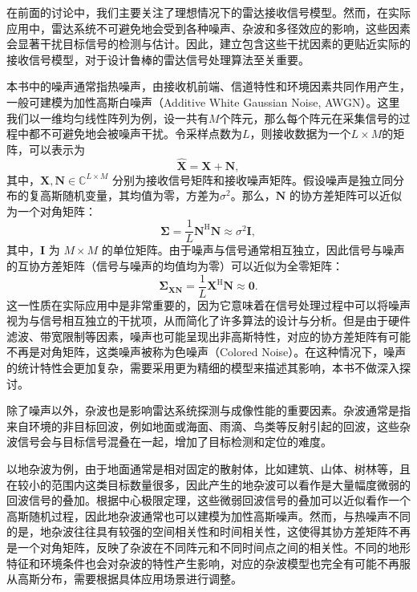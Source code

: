 在前面的讨论中，我们主要关注了理想情况下的雷达接收信号模型。然而，在实际应用中，雷达系统不可避免地会受到各种噪声、杂波和多径效应的影响，这些因素会显著干扰目标信号的检测与估计。因此，建立包含这些干扰因素的更贴近实际的接收信号模型，对于设计鲁棒的雷达信号处理算法至关重要。

本书中的噪声通常指热噪声，由接收机前端、信道特性和环境因素共同作用产生，一般可建模为加性高斯白噪声（Additive White Gaussian Noise, AWGN）。这里我们以一维均匀线性阵列为例，设一共有\( M \)个阵元，那么每个阵元在采集信号的过程中都不可避免地会被噪声干扰。令采样点数为\( L \)，则接收数据为一个\( L \times M \)的矩阵，可以表示为
\[
    \hat{\mathbf{X}} = \mathbf{X} + \mathbf{N},
\]
其中，\(\mathbf{X}, \mathbf{N} \in \mathbb{C}^{L \times M}\) 分别为接收信号矩阵和接收噪声矩阵。假设噪声是独立同分布的复高斯随机变量，其均值为零，方差为\( \sigma^2 \)。那么，\(\mathbf{N}\) 的协方差矩阵可以近似为一个对角矩阵：
\[
    \mathbf{\Sigma} = \frac{1}{L} \mathbf{N}^{\mathrm{H}} \mathbf{N} \approx \sigma^2 \mathbf{I},
\]
其中，\(\mathbf{I}\) 为 \(M \times M\) 的单位矩阵。由于噪声与信号通常相互独立，因此信号与噪声的互协方差矩阵（信号与噪声的均值均为零）可以近似为全零矩阵：
\[
    \mathbf{\Sigma}_{\mathbf{XN}} = \frac{1}{L} \mathbf{X}^{\mathrm{H}} \mathbf{N} \approx \mathbf{0}.
\]
这一性质在实际应用中是非常重要的，因为它意味着在信号处理过程中可以将噪声视为与信号相互独立的干扰项，从而简化了许多算法的设计与分析。但是由于硬件滤波、带宽限制等因素，噪声也可能呈现出非高斯特性，对应的协方差矩阵有可能不再是对角矩阵，这类噪声被称为色噪声（Colored Noise）。在这种情况下，噪声的统计特性会更加复杂，需要采用更为精细的模型来描述其影响，本书不做深入探讨。

除了噪声以外，杂波也是影响雷达系统探测与成像性能的重要因素。杂波通常是指来自环境的非目标回波，例如地面或海面、雨滴、鸟类等反射引起的回波，这些杂波信号会与目标信号混叠在一起，增加了目标检测和定位的难度。

以地杂波为例，由于地面通常是相对固定的散射体，比如建筑、山体、树林等，且在较小的范围内这类目标数量很多，因此产生的地杂波可以看作是大量幅度微弱的回波信号的叠加。根据中心极限定理，这些微弱回波信号的叠加可以近似看作一个高斯随机过程，因此地杂波通常也可以建模为加性高斯噪声。然而，与热噪声不同的是，地杂波往往具有较强的空间相关性和时间相关性，这使得其协方差矩阵不再是一个对角矩阵，反映了杂波在不同阵元和不同时间点之间的相关性。不同的地形特征和环境条件也会对杂波的特性产生影响，对应的杂波模型也完全有可能不再服从高斯分布，需要根据具体应用场景进行调整。

